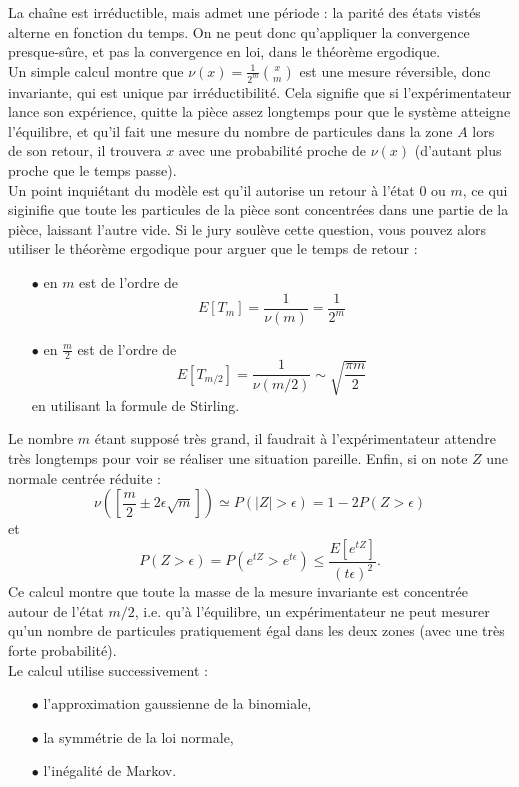 La chaîne est irréductible, mais admet une période : la parité des états vistés alterne en fonction du temps. On ne peut donc qu'appliquer la convergence presque-sûre, et pas la convergence en loi, dans le théorème ergodique.\\

Un simple calcul montre que $\nu(x)=\frac{1}{2^m}\binom{x}{m}$ est une mesure réversible, donc invariante, qui est unique par irréductibilité. Cela signifie que si l'expérimentateur lance son expérience, quitte la pièce assez longtemps pour que le système atteigne l'équilibre, et qu'il fait une mesure du nombre de particules dans la zone $A$ lors de son retour, il trouvera $x$ avec une probabilité proche de $\nu(x)$ (d'autant plus proche que le temps passe).\\

Un point inquiétant du modèle est qu'il autorise un retour à l'état $0$ ou $m$, ce qui siginifie que toute les particules de la pièce sont concentrées dans une partie de la pièce, laissant l'autre vide. Si le jury soulève cette question, vous pouvez alors utiliser le théorème ergodique pour arguer que le temps de retour :\\

\begin{itemize}
\item[$\bullet$] en $m$ est de l'ordre de 
\[E[T_m]=\frac{1}{\nu(m)}=\frac{1}{2^m} \]
\item[$\bullet$] en $\frac{m}{2}$ est de l'ordre de 
\[E[T_{m/2}]=\frac{1}{\nu(m/2)}\sim\sqrt{\frac{\pi m}{2}} \]
en utilisant la formule de Stirling.\\
\end{itemize}

Le nombre $m$ étant supposé très grand, il faudrait à l'expérimentateur attendre très longtemps pour voir se réaliser une situation pareille. Enfin, si on note $Z$ une normale centrée réduite :
\[\nu([\frac{m}{2}\pm 2\epsilon \sqrt{m}]) \simeq P(|Z|>\epsilon)=1-2P(Z>\epsilon) \]
et 
\[P(Z>\epsilon)=P(e^{tZ}>e^{t\epsilon})\leq \frac{E[e^{tZ}]}{(t\epsilon)^2}.\]
Ce calcul montre que toute la masse de la mesure invariante est concentrée autour de l'état $m/2$, i.e. qu'à l'équilibre, un expérimentateur ne peut mesurer qu'un nombre de particules pratiquement égal dans les deux zones (avec une très forte probabilité).\\

Le calcul utilise successivement :
\begin{itemize}
\item[$\bullet$] l'approximation gaussienne de la binomiale,
\item[$\bullet$] la symmétrie de la loi normale,
\item[$\bullet$] l'inégalité de Markov.
\end{itemize}

